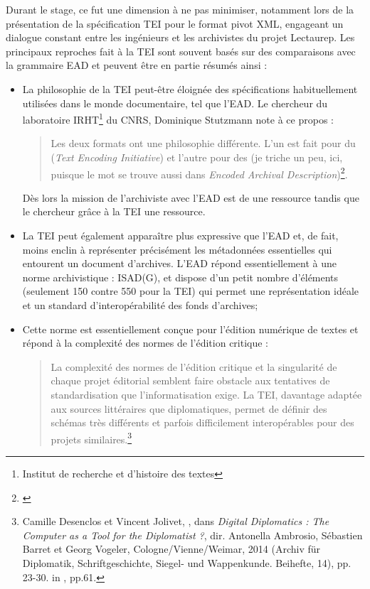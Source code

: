 Durant le stage, ce fut une dimension à ne pas minimiser, notamment lors de la présentation de la spécification TEI pour le format pivot XML, engageant un dialogue constant entre les ingénieurs et les archivistes du projet Lectaurep. Les principaux reproches fait à la TEI sont souvent basés sur des comparaisons avec la grammaire EAD et peuvent être en partie résumés ainsi :\\
\begin{itemize}
    \item La philosophie de la TEI peut-être éloignée des spécifications habituellement utilisées dans le monde documentaire, tel que l'EAD. Le chercheur du laboratoire IRHT\footnote{Institut de recherche et d'histoire des textes} du CNRS, Dominique Stutzmann note à ce propos : 
    \begin{quote}
        Les deux formats ont une philosophie différente. L'un est fait pour  du  
        (\textit{Text Encoding Initiative}) et l'autre pour  des  (je triche un peu, ici, puisque le mot  se trouve aussi dans \textit{Encoded Archival Description})\footnote{\cite{stutzmann_ead-tei_2019}}.
    \end{quote}
    Dès lors la mission de l'archiviste avec l'EAD est de  une ressource tandis que le chercheur grâce à la TEI  une ressource.\\
    \item La TEI peut également apparaître plus expressive que l'EAD et, de fait, moins enclin à représenter précisément les métadonnées essentielles qui entourent un document d'archives. L'EAD répond essentiellement à une norme archivistique : ISAD(G), et dispose d'un petit nombre d'éléments (seulement 150 contre 550 pour la TEI) qui permet une représentation idéale et un standard d'interopérabilité des fonds d'archives;\\
    \item Cette norme est essentiellement conçue pour l'édition numérique de textes et répond à la complexité des normes de l'édition critique : 
    \begin{quote}
        La  complexité  des  normes  de  l'édition  critique  et  la  singularité  de  chaque  projet éditorial semblent faire obstacle aux tentatives de standardisation que l'informatisation  exige. La  TEI,
        davantage  adaptée  aux  sources  littéraires  que diplomatiques, permet de définir des schémas très différents et parfois difficilement interopérables pour des projets similaires.\footnote{Camille  Desenclos  et  Vincent  Jolivet,  ,  dans  \textit{Digital  Diplomatics : The Computer as a Tool for the Diplomatist ?},  dir.  Antonella  Ambrosio,  Sébastien  Barret  et  Georg  Vogeler, Cologne/Vienne/Weimar, 2014 (Archiv für Diplomatik, Schriftgeschichte, Siegel- und Wappenkunde. Beihefte, 14), pp. 23-30. in \cite{canteaut_actes_2020}, pp.61.} 
    \end{quote} 
\end{itemize}
